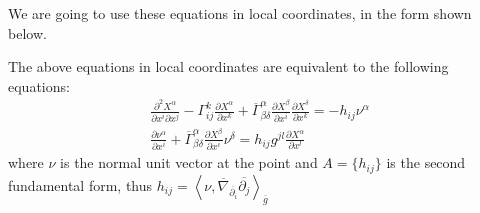 We are going to use these equations in local coordinates, in the form shown below. 
\begin{proposition}
	The above equations in local coordinates are equivalent to the following equations:
	\begin{align}
		\label{Weingarten1} \frac{\partial^2 X^\alpha}{\partial x^i \partial x^j} - \Gamma^k_{ij}\frac{\partial X^\alpha}{\partial x^k}+\overline{\Gamma}^\alpha_{\beta \delta}\frac{\partial X^\beta}{\partial x^i}\frac{\partial X^\delta}{\partial x^k}=-h_{ij}\nu^\alpha \\
		\label{Weingarten2} \frac{\partial \nu^\alpha}{\partial x^i}+\overline{\Gamma}^\alpha_{\beta \delta}\frac{\partial X^\beta}{\partial x^i} \nu^\delta = h_{ij}g^{jl}\frac{\partial X^\alpha}{\partial x^l}
	\end{align} 
	where $\nu$ is the normal unit vector at the point and $A=\{h_{ij}\}$ is the second fundamental form, thus $h_{ij}= \left\langle  \nu, \overline{\nabla}_{\overline{\partial_i}} \overline{\partial_j} \right\rangle_{\overline{g}} $
\end{proposition}
